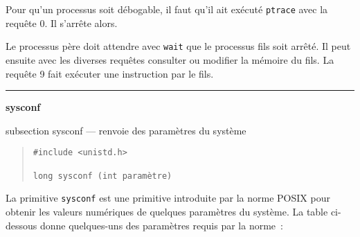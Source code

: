 \documentclass [twoside] {report}
\newcommand {\primitive} [1]
    {
	{\large \bf #1}
	\addcontentsline {toc} {subsection} {#1}
    }
\newcommand {\separation}
    {
	\vspace {7mm}
	\nopagebreak
	\hrule
    }
\begin{document}
Pour qu'un processus soit débogable, il faut
qu'il ait exécuté {\tt ptrace} avec la requête 0. Il
s'arrête alors.

Le processus père doit attendre avec {\tt wait} que
le processus fils soit arrêté. Il peut ensuite
avec les diverses requêtes consulter ou modifier
la mémoire du fils. La requête 9 fait exécuter une
instruction par le fils.




\separation
\primitive {sysconf} --- renvoie des paramètres du système
    \label {sysconf}

\begin {quote}
\begin {verbatim}
#include <unistd.h>

long sysconf (int paramètre)
\end{verbatim}
\end {quote}

La primitive {\tt sysconf} est une primitive introduite
par la norme POSIX pour obtenir les valeurs numériques
de quelques paramètres du système. La table ci-dessous
donne quelques-uns des paramètres requis par la norme~:
\end{document}
